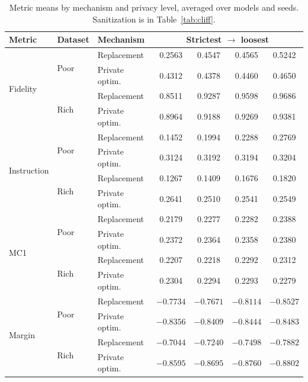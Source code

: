 \begin{table}[t]
  \centering
  \caption{Metric means by mechanism and privacy level,
  averaged over models and seeds.
  Sanitization is in Table~\ref{tab:cliff}.}
  \label{tab:levels}
  \small
  \setlength{\tabcolsep}{4pt}
  \begin{tabular}{lllcccc}
    \toprule
    Metric & Dataset & Mechanism & \multicolumn{4}{c}{Strictest $\to$ loosest} \\
    \midrule
    \multirow{4}{*}{Fidelity}
      & \multirow{2}{*}{Poor} & Replacement    & 0.2563 & 0.4547 & 0.4565 & 0.5242 \\
      & & Private optim. & 0.4312 & 0.4378 & 0.4460 & 0.4650 \\
      & \multirow{2}{*}{Rich} & Replacement    & 0.8511 & 0.9287 & 0.9598 & 0.9686 \\
      & & Private optim. & 0.8964 & 0.9188 & 0.9269 & 0.9381 \\
    \midrule
    \multirow{4}{*}{Instruction}
      & \multirow{2}{*}{Poor} & Replacement    & 0.1452 & 0.1994 & 0.2288 & 0.2769 \\
      & & Private optim. & 0.3124 & 0.3192 & 0.3194 & 0.3204 \\
      & \multirow{2}{*}{Rich} & Replacement    & 0.1267 & 0.1409 & 0.1676 & 0.1820 \\
      & & Private optim. & 0.2641 & 0.2510 & 0.2541 & 0.2549 \\
    \midrule
    \multirow{4}{*}{MC1}
      & \multirow{2}{*}{Poor} & Replacement    & 0.2179 & 0.2277 & 0.2282 & 0.2388 \\
      & & Private optim. & 0.2372 & 0.2364 & 0.2358 & 0.2380 \\
      & \multirow{2}{*}{Rich} & Replacement    & 0.2207 & 0.2218 & 0.2292 & 0.2312 \\
      & & Private optim. & 0.2304 & 0.2294 & 0.2293 & 0.2279 \\
    \midrule
    \multirow{4}{*}{Margin}
      & \multirow{2}{*}{Poor} & Replacement    & $-0.7734$ & $-0.7671$ & $-0.8114$ & $-0.8527$ \\
      & & Private optim. & $-0.8356$ & $-0.8409$ & $-0.8444$ & $-0.8483$ \\
      & \multirow{2}{*}{Rich} & Replacement    & $-0.7044$ & $-0.7240$ & $-0.7498$ & $-0.7882$ \\
      & & Private optim. & $-0.8595$ & $-0.8695$ & $-0.8760$ & $-0.8802$ \\
    \bottomrule
  \end{tabular}
\end{table}

